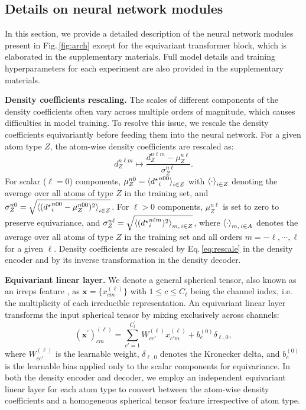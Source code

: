 \documentclass[%
reprint,
superscriptaddress,
bibnotes,
amsmath,amssymb,
aps,
floatfix, %
]{revtex4-2}
\begin{document}
\subsection{\label{sec:module}Details on neural network modules}

\noindent In this section, we provide a detailed description of the neural network modules present in Fig.\,\ref{fig:arch} except for the equivariant transformer block, which is elaborated in the supplementary materials. Full model details and training hyperparameters for each experiment are also provided in the supplementary materials.

\vspace{\baselineskip}
\noindent\textbf{Density coefficients rescaling.} The scales of different components of the density coefficients often vary across multiple orders of magnitude, which causes difficulties in model training. To resolve this issue, we rescale the density coefficients equivariantly before feeding them into the neural network. For a given atom type $Z$, the atom-wise density coefficients are rescaled as:
\begin{equation}
  \label{eq:rescale}
  d_Z^{n \ell m} \mapsto \frac{d_Z^{n\ell m} - \mu_{Z}^{n\ell}}{\sigma_Z^{n\ell}}.
\end{equation}
For scalar ($\ell = 0$) components, $\mu_Z^{n0} = \braket{{d^{\star}}^{n00}_i}_{i \in Z}$ with $\braket{\cdot}_{i \in Z}$ denoting the average over all atoms of type $Z$ in the training set, and $\sigma_Z^{n0} = \sqrt{\braket{({d^\star}_i^{n00} - \mu_Z^{n00})^2}_{i\in Z}}$. For $\ell > 0$ components, $\mu_Z^{n\ell}$ is set to zero to preserve equivariance, and $\sigma_Z^{n\ell} = \sqrt{\braket{({d^\star}_i^{n\ell m} )^2}_{m,\,i\in Z}}$, where $\braket{\cdot}_{m,\,i \in A}$ denotes the average over all atoms of type $Z$ in the training set and all orders $m = -\ell, \cdots, \ell$ for a given $\ell$. Density coefficients are rescaled by Eq.\,\eqref{eq:rescale} in the density encoder and by its inverse transformation in the density decoder.


\vspace{\baselineskip}
\noindent\textbf{Equivariant linear layer.} We denote a general spherical tensor, also known as an irreps feature \cite{geiger2022e3nn}, as $\mathbf{x} = \{x^{(\ell)}_{cm}\}$ with $1 \le c \le C_\ell$ being the channel index, i.e. the multiplicity of each irreducible representation. An equivariant linear layer transforms the input spherical tensor by mixing exclusively across channels:
\begin{equation}
  (\mathbf{x}^\prime)^{(\ell)}_{cm} = \sum_{c'=1}^{C_l^\prime} W^{(\ell)}_{cc'} {x}^{(\ell)}_{c'm} + b^{(0)}_c \delta_{\ell,0},
\end{equation}
where $W^{(\ell)}_{cc'}$ is the learnable weight, $\delta_{\ell,0}$ denotes the Kronecker delta, and $b^{(0)}_c$ is the learnable bias applied only to the scalar components for equivariance. In both the density encoder and decoder, we employ an independent equivariant linear layer for each atom type to convert between the atom-wise density coefficients and a homogeneous spherical tensor feature irrespective of atom type.
\end{document}
